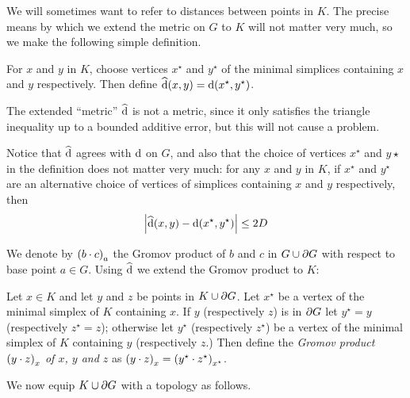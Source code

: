 \documentclass[a4paper]{article}
\begin{document}
We will sometimes want to refer to distances between points in $K$. The
precise means by which we extend the metric on $G$ to $K$ will not matter
very much, so we make the following simple definition.

\begin{definition}
  For $x$ and $y$ in $K$, choose vertices $x^\star$ and $y^\star$ of the
  minimal simplices containing $x$ and $y$ respectively. Then define
  $\newdist(x,y) = \dist(x^\star, y^\star)$.  
\end{definition}

\begin{remark}\label{rem:dist_vs_newdist}
  The extended ``metric'' $\newdist$ is not a metric, since it only satisfies
  the triangle inequality up to a bounded additive error, but this will not
  cause a problem.

  Notice that $\newdist$ agrees with $\dist$ on $G$, and also that the choice
  of vertices $x^\star$ and $y\star$ in the definition does not matter very
  much: for any $x$ and $y$ in $K$, if $x^\star$ and $y^\star$ are an
  alternative choice of vertices of simplices containing $x$ and $y$
  respectively, then
  \begin{equation*}
    \abs{\newdist(x,y) - \dist(x^\star, y^\star)} \leq 2D
  \end{equation*}
\end{remark}

We denote by $\gromov{a}{b}{c}$ the Gromov product of $b$ and $c$ in $G \union
\boundary G$ with respect to base point $a \in G$. Using $\newdist$ we extend
the Gromov product to $K$:

\begin{definition}
  Let $x \in K$ and let $y$ and $z$ be points in $K \union \boundary G$. Let
  $x^\star$ be a vertex of the minimal simplex of $K$ containing $x$. If $y$
  (respectively $z$) is in $\boundary G$ let $y^\star = y$ (respectively
  $z^\star = z$); otherwise let $y^\star$ (respectively $z^\star$) be a vertex
  of the minimal simplex of $K$ containing $y$ (respectively $z$.)
  Then define the \emph{Gromov product $\gromov{x}{y}{z}$ of $x$, $y$ and $z$}
  as $\gromov{x}{y}{z} = \gromov{x^\star}{y^\star}{z^\star}$.
\end{definition}

We now equip $K \union \boundary G$ with a topology as follows.
\end{document}
